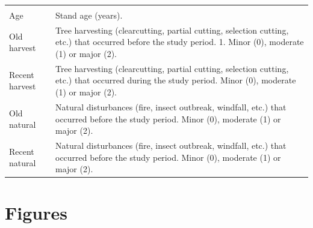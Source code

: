 \documentclass[a4paperpaper,]{article}
\begin{document}
\begin{longtable}[]{@{}ll@{}}
\begin{minipage}[t]{0.72\columnwidth}
\end{minipage}\tabularnewline
\begin{minipage}[t]{0.22\columnwidth}\raggedright
Age\strut
\end{minipage} & \begin{minipage}[t]{0.72\columnwidth}\raggedright
Stand age (years).\strut
\end{minipage}\tabularnewline
\begin{minipage}[t]{0.22\columnwidth}\raggedright
Old harvest\strut
\end{minipage} & \begin{minipage}[t]{0.72\columnwidth}\raggedright
Tree harvesting (clearcutting, partial cutting, selection cutting, etc.)
that occurred before the study period. 1. Minor (0), moderate (1) or
major (2).\strut
\end{minipage}\tabularnewline
\begin{minipage}[t]{0.22\columnwidth}\raggedright
Recent harvest\strut
\end{minipage} & \begin{minipage}[t]{0.72\columnwidth}\raggedright
Tree harvesting (clearcutting, partial cutting, selection cutting, etc.)
that occurred during the study period. Minor (0), moderate (1) or major
(2).\strut
\end{minipage}\tabularnewline
\begin{minipage}[t]{0.22\columnwidth}\raggedright
Old natural\strut
\end{minipage} & \begin{minipage}[t]{0.72\columnwidth}\raggedright
Natural disturbances (fire, insect outbreak, windfall, etc.) that
occurred before the study period. Minor (0), moderate (1) or major
(2).\strut
\end{minipage}\tabularnewline
\begin{minipage}[t]{0.22\columnwidth}\raggedright
Recent natural\strut
\end{minipage} & \begin{minipage}[t]{0.72\columnwidth}\raggedright
Natural disturbances (fire, insect outbreak, windfall, etc.) that
occurred before the study period. Minor (0), moderate (1) or major
(2).\strut
\end{minipage}\tabularnewline
\bottomrule
\end{longtable}

\pagebreak

\hypertarget{figures}{%
\section{Figures}\label{figures}}
\end{document}
